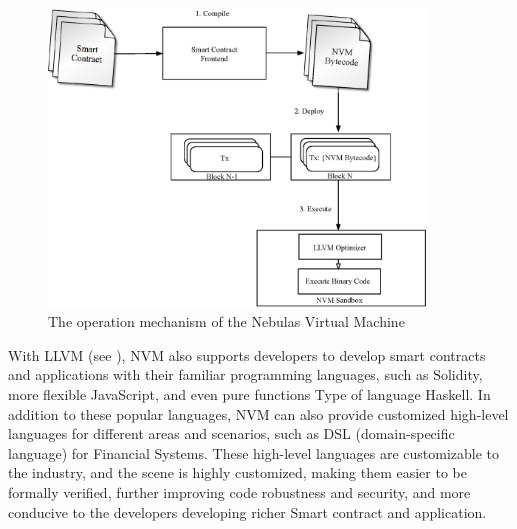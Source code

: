 \begin{figure}[h]
\centering
\includegraphics[width=10cm]{./figs/nvm-process}
\caption{The operation mechanism of the Nebulas Virtual Machine}
\label{fig:nvm-process}
\end{figure}

With LLVM (see ), NVM also supports developers to develop smart contracts and applications with their familiar programming languages, such as Solidity, more flexible JavaScript, and even pure functions Type of language Haskell. In addition to these popular languages, NVM can also provide customized high-level languages ​​for different areas and scenarios, such as DSL (domain-specific language) for Financial Systems. These high-level languages ​​are customizable to the industry, and the scene is highly customized, making them easier to be formally verified, further improving code robustness and security, and more conducive to the developers developing richer Smart contract and application.

